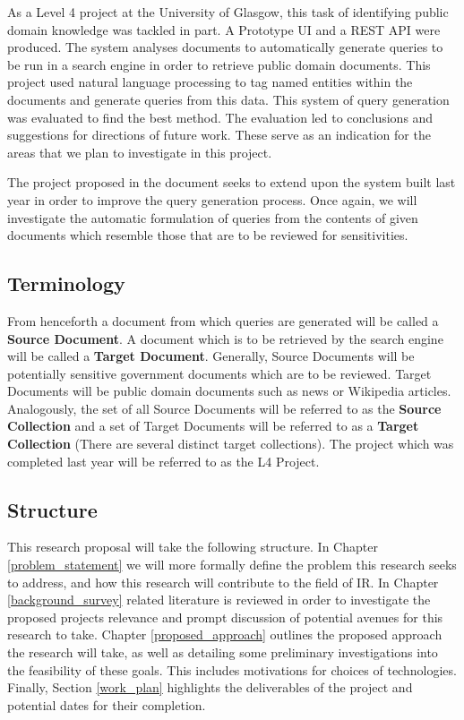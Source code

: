 \documentclass{mprop}
\begin{document}
As a Level 4 project at the University of Glasgow, this task of identifying public domain knowledge was tackled in part. A Prototype UI and a REST API were produced. The system analyses documents to automatically generate queries to be run in a search engine in order to retrieve public domain documents. This project used natural language processing to tag named entities within the documents and generate queries from this data. This system of query generation was evaluated to find the best method. The evaluation led to conclusions and suggestions for directions of future work. These serve as an indication for the areas that we plan to investigate in this project.


The project proposed in the document seeks to extend upon the system built last year in order to improve the query generation process. Once again, we will investigate the automatic formulation of queries from the contents of given documents which resemble those that are to be reviewed for sensitivities.

\subsection{Terminology}
From henceforth a document from which queries are generated will be called a \textbf{Source Document}. A document which is to be retrieved by the search engine will be called a \textbf{Target Document}.
Generally, Source Documents will be potentially sensitive government documents which are to be reviewed. Target Documents will be public domain documents such as news or Wikipedia articles.
Analogously, the set of all Source Documents will be referred to as the \textbf{Source Collection} and a set of Target Documents will be referred to as a \textbf{Target Collection} (There are several distinct target collections).
The project which was completed last year will be referred to as the L4 Project.

\subsection{Structure}
This research proposal will take the following structure. In Chapter \ref{problem_statement} we will more formally define the problem this research seeks to address, and how this research will contribute to the field of IR. In Chapter \ref{background_survey} related literature is reviewed in order to investigate the proposed projects relevance and prompt discussion of potential avenues for this research to take. Chapter \ref{proposed_approach} outlines the proposed approach the research will take, as well as detailing some preliminary investigations into the feasibility of these goals. This includes motivations for choices of technologies. Finally, Section \ref{work_plan} highlights the deliverables of the project and potential dates for their completion.
\end{document}

